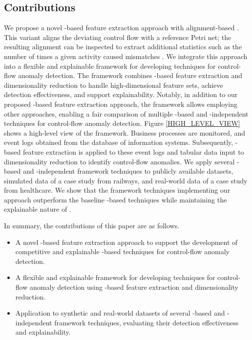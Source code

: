 \subsection{Contributions}
We propose a novel -based feature extraction approach with alignment-based . This variant aligns the deviating control flow with a reference Petri net; the resulting alignment can be inspected to extract additional statistics such as the number of times a given activity caused mismatches \cite{aalst2022pmhandbook}. We integrate this approach into a flexible and explainable framework for developing techniques for control-flow anomaly detection. The framework combines -based feature extraction and dimensionality reduction to handle high-dimensional feature sets, achieve detection effectiveness, and support explainability. Notably, in addition to our proposed -based feature extraction approach, the framework allows employing other approaches, enabling a fair comparison of multiple -based and -independent techniques for control-flow anomaly detection. Figure \ref{HIGH_LEVEL_VIEW} shows a high-level view of the framework. Business processes are monitored, and event logs obtained from the database of information systems. Subsequently, -based feature extraction is applied to these event logs and tabular data input to dimensionality reduction to identify control-flow anomalies. We apply several -based and -independent framework techniques to publicly available datasets, simulated data of a case study from railways, and real-world data of a case study from healthcare. We show that the framework techniques implementing our approach outperform the baseline -based techniques while maintaining the explainable nature of .

In summary, the contributions of this paper are as follows.
\begin{itemize}
    \item{
        A novel -based feature extraction approach to support the development of competitive and explainable -based techniques for control-flow anomaly detection.
    }
    \item{
        A flexible and explainable framework for developing techniques for control-flow anomaly detection using -based feature extraction and dimensionality reduction.
    }
    \item{
        Application to synthetic and real-world datasets of several -based and -independent framework techniques, evaluating their detection effectiveness and explainability.
    }
\end{itemize}

